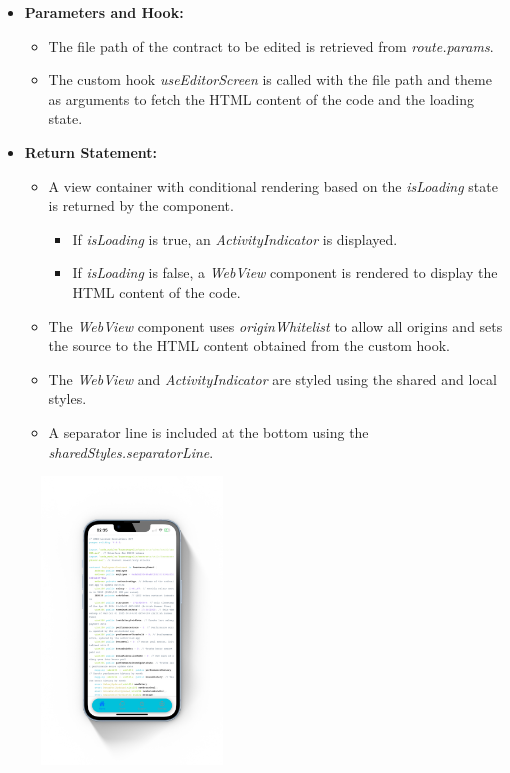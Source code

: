 \begin{itemize}
    \item \textbf{Parameters and Hook:}
    \begin{itemize}
        \item The file path of the contract to be edited is retrieved from \textit{route.params}.
        \item The custom hook \textit{useEditorScreen} is called with the file path and theme as arguments to fetch the HTML content of the code and the loading state.
    \end{itemize}

    \item \textbf{Return Statement:}
    \begin{itemize}
        \item A view container with conditional rendering based on the \textit{isLoading} state is returned by the component.
        \begin{itemize}
            \item If \textit{isLoading} is true, an \textit{ActivityIndicator} is displayed.
            \item If \textit{isLoading} is false, a \textit{WebView} component is rendered to display the HTML content of the code.
        \end{itemize}
        \item The \textit{WebView} component uses \textit{originWhitelist} to allow all origins and sets the source to the HTML content obtained from the custom hook.
        \item The \textit{WebView} and \textit{ActivityIndicator} are styled using the shared and local styles.
        
        \item A separator line is included at the bottom using the \textit{sharedStyles.separatorLine}.
    \end{itemize}
\end{itemize}

\begin{figure}[!ht]
    \centering
    \includegraphics[width=0.43\textwidth]
    {LATEX/Appendices/Images/Software/Frontend/editor_screen.png}
    \label{fig:editor screen}
\end{figure}

